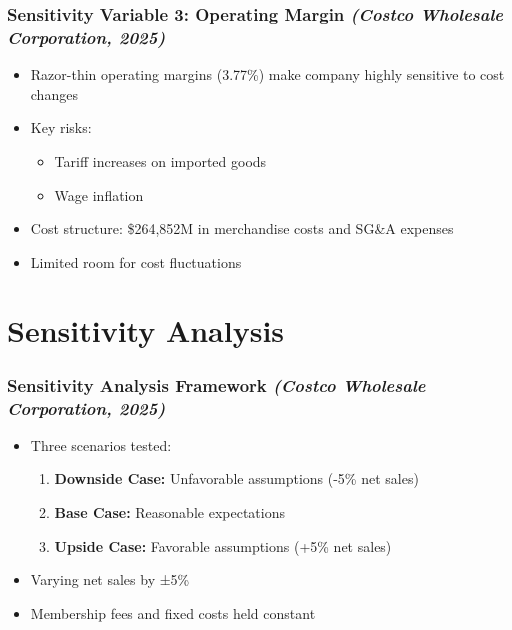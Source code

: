 \documentclass[11pt]{beamer}
\begin{document}
\begin{frame}
\frametitle{Sensitivity Variable 3: Operating Margin \textit{(Costco Wholesale Corporation, 2025)}}
\begin{itemize}
  \item Razor-thin operating margins (3.77\%) make company highly sensitive to cost changes
  \item Key risks:
    \begin{itemize}
      \item Tariff increases on imported goods
      \item Wage inflation
    \end{itemize}
  \item Cost structure: \$264,852M in merchandise costs and SG\&A expenses
  \item Limited room for cost fluctuations
\end{itemize}
\end{frame}

\section{Sensitivity Analysis}
\begin{frame}
\frametitle{Sensitivity Analysis Framework \textit{(Costco Wholesale Corporation, 2025)}}
\begin{itemize}
  \item Three scenarios tested:
    \begin{enumerate}
      \item \textbf{Downside Case:} Unfavorable assumptions (-5\% net sales)
      \item \textbf{Base Case:} Reasonable expectations
      \item \textbf{Upside Case:} Favorable assumptions (+5\% net sales)
    \end{enumerate}
  \item Varying net sales by ±5\%
  \item Membership fees and fixed costs held constant
\end{itemize}
\end{frame}
\end{document}
